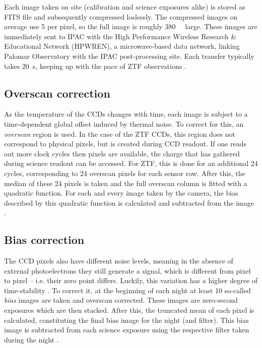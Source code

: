 Each image taken on site (calibration and science exposures alike) is stored as FITS file and subsequently compressed loslessly. The compressed images on average use \SI{5}{\bit} per pixel, so the full image is roughly \SI{380}{\mega\byte} large. These images are immediately sent to IPAC with the High Performance Wireless Research \& Educational Network (HPWREN), a microwave-based data network, linking Palomar Observatory with the IPAC post-processing site. Each transfer typically takes \SI{20}{\second}, keeping up with the pace of ZTF observations \cite{Dekany2020}.

\subsection{Overscan correction}
As the temperature of the CCDs changes with time, each image is subject to a time-dependent global offset induced by thermal noise. To correct for this, an \textit{overscan} region is used. In the case of the ZTF CCDs, this region does not correspond to physical pixels, but is created during CCD readout. If one reads out more clock cycles then pixels are available, the charge that has gathered during science readout can be accessed. For ZTF, this is done for an additional 24 cycles, corresponding to 24 overscan pixels for each sensor row. After this, the median of these 24 pixels is taken and the full overscan column is fitted with a quadratic function. For each and every image taken by the camera, the bias described by this quadratic function is calculated and subtracted from the image \cite{Masci2019a}.

\subsection{Bias correction}
The CCD pixels also have different noise levels, meaning in the absence of external photoelectrons they still generate a signal, which is different from pixel to pixel -- i.e. their zero point differs. Luckily, this variation has a higher degree of time-stability . To correct it, at the beginning of each night at least 10 so-called \textit{bias} images are taken and overscan corrected. These images are zero-second exposures which are then stacked. After this, the truncated mean of each pixel is calculated, constituting the final bias image for the night (and filter). This bias image is subtracted from each science exposure using the respective filter taken during the night \cite{Masci2019a}.



